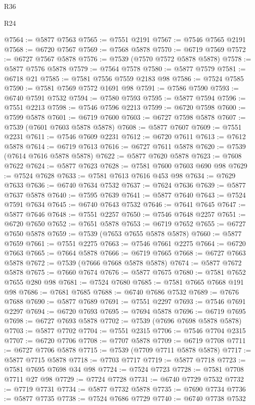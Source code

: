 \begin{lexlean}{R36}
\begin{lexlean}{R24}
\begin{coremodule}
{{{{{{{{{{{{{{{{{{{{{{{{{{{{{{{{{{{{{{{{{{{{{{{{{{{{{{{{{{{{{{{{{{{{{{{{{{{{{{{{{{{{{{{{{{{{{{{{{{{{{{{{{{{{{{{{{{{{{{{{{{{{{{{{{{{{{{{{{{{{{{{{{{{{{{{{{{{{{{{{{{{{{{{{{{{{{{{{{{{{{{{{{{{{{{{{{{{@7564 := @5877 @7563
@7565 := @7551 @2191
@7567 := @7546 @7565 @2191
@7568 := @6720 @7567
@7569 := @7568 @5878
@7570 := @6719 @7569
@7572 := @6727 @7567 @5878
@7576 := @7539 (@7570 @7572 @5878 @5878)
@7578 := @5877 @7576 @5878
@7579 := @7564 @7578
@7580 := @5877 @7579
@7581 := @6718 @21
@7585 := @7581 @7556 @7559 @2183 @98
@7586 := @7524 @7585
@7590 := @7581 @7569 @7572 @1691 @98
@7591 := @7586 @7590
@7593 := @6740 @7591 @7532
@7594 := @7580 @7593
@7595 := @5877 @7594
@7596 := @7551 @2213
@7598 := @7546 @7596 @2213
@7599 := @6720 @7598
@7600 := @7599 @5878
@7601 := @6719 @7600
@7603 := @6727 @7598 @5878
@7607 := @7539 (@7601 @7603 @5878 @5878)
@7608 := @5877 @7607
@7609 := @7551 @2231
@7611 := @7546 @7609 @2231
@7612 := @6720 @7611
@7613 := @7612 @5878
@7614 := @6719 @7613
@7616 := @6727 @7611 @5878
@7620 := @7539 (@7614 @7616 @5878 @5878)
@7622 := @5877 @7620 @5878
@7623 := @7608 @7622
@7624 := @5877 @7623
@7628 := @7581 @7600 @7603 @690 @98
@7629 := @7524 @7628
@7633 := @7581 @7613 @7616 @453 @98
@7634 := @7629 @7633
@7636 := @6740 @7634 @7532
@7637 := @7624 @7636
@7639 := @5877 @7637 @5878
@7640 := @7595 @7639
@7641 := @5877 @7640
@7643 := @7524 @7591 @7634
@7645 := @6740 @7643 @7532
@7646 := @7641 @7645
@7647 := @5877 @7646
@7648 := @7551 @2257
@7650 := @7546 @7648 @2257
@7651 := @6720 @7650
@7652 := @7651 @5878
@7653 := @6719 @7652
@7655 := @6727 @7650 @5878
@7659 := @7539 (@7653 @7655 @5878 @5878)
@7660 := @5877 @7659
@7661 := @7551 @2275
@7663 := @7546 @7661 @2275
@7664 := @6720 @7663
@7665 := @7664 @5878
@7666 := @6719 @7665
@7668 := @6727 @7663 @5878
@7672 := @7539 (@7666 @7668 @5878 @5878)
@7674 := @5877 @7672 @5878
@7675 := @7660 @7674
@7676 := @5877 @7675
@7680 := @7581 @7652 @7655 @280 @98
@7681 := @7524 @7680
@7685 := @7581 @7665 @7668 @191 @98
@7686 := @7681 @7685
@7688 := @6740 @7686 @7532
@7689 := @7676 @7688
@7690 := @5877 @7689
@7691 := @7551 @2297
@7693 := @7546 @7691 @2297
@7694 := @6720 @7693
@7695 := @7694 @5878
@7696 := @6719 @7695
@7698 := @6727 @7693 @5878
@7702 := @7539 (@7696 @7698 @5878 @5878)
@7703 := @5877 @7702
@7704 := @7551 @2315
@7706 := @7546 @7704 @2315
@7707 := @6720 @7706
@7708 := @7707 @5878
@7709 := @6719 @7708
@7711 := @6727 @7706 @5878
@7715 := @7539 (@7709 @7711 @5878 @5878)
@7717 := @5877 @7715 @5878
@7718 := @7703 @7717
@7719 := @5877 @7718
@7723 := @7581 @7695 @7698 @34 @98
@7724 := @7524 @7723
@7728 := @7581 @7708 @7711 @27 @98
@7729 := @7724 @7728
@7731 := @6740 @7729 @7532
@7732 := @7719 @7731
@7734 := @5877 @7732 @5878
@7735 := @7690 @7734
@7736 := @5877 @7735
@7738 := @7524 @7686 @7729
@7740 := @6740 @7738 @7532
}}}}}}}}}}}}}}}}}}}}}}}}}}}}}}}}}}}}}}}}}}}}}}}}}}}}}}}}}}}}}}}}}}}}}}}}}}}}}}}}}}}}}}}}}}}}}}}}}}}}}}}}}}}}}}}}}}}}}}}}}}}}}}}}}}}}}}}}}}}}}}}}}}}}}}}}}}}}}}}}}}}}}}}}}}}}}}}}}}}}}}}}}}}}}}}}}}}
\end{coremodule}
\end{lexlean}
\end{lexlean}
